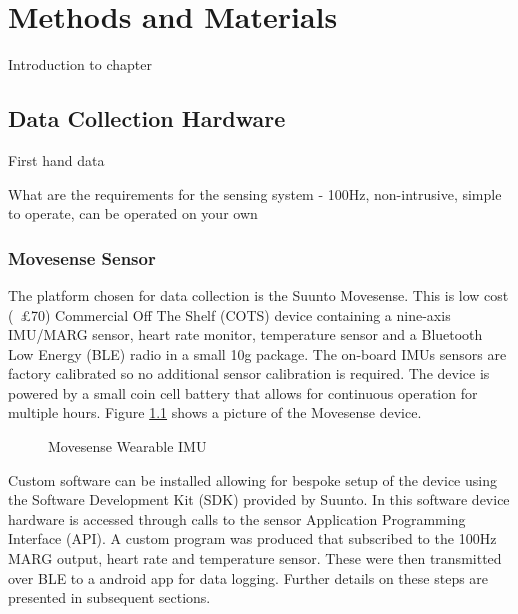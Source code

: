 \chapter{Methods and Materials}
Introduction to chapter




\section{Data Collection Hardware}
First hand data

What are the requirements for the sensing system - 100Hz, non-intrusive, simple to operate, can be operated on your own



\subsection{Movesense Sensor}
The platform chosen for data collection is the Suunto Movesense. This is low cost (~£70) Commercial Off The Shelf (COTS) device containing a nine-axis IMU/MARG sensor, heart rate monitor, temperature sensor and a Bluetooth Low Energy (BLE) radio in a small 10g package. The on-board IMUs sensors are factory calibrated so no additional sensor calibration is required. The device is powered by a small coin cell battery that allows for continuous operation for multiple hours. Figure \ref{fig:methods-movesense-sensor} shows a picture of the Movesense device.

\begin{figure}[!hbt]
    \centering
    \caption{Movesense Wearable IMU}
    \label{fig:methods-movesense-sensor}
\end{figure}

Custom software can be installed allowing for bespoke setup of the device using the Software Development Kit (SDK) provided by Suunto. In this software device hardware is accessed through calls to the sensor Application Programming Interface (API). A custom program was produced that subscribed to the 100Hz MARG output, heart rate and temperature sensor. These were then transmitted over BLE to a android app for data logging. Further details on these steps are presented in subsequent sections.

